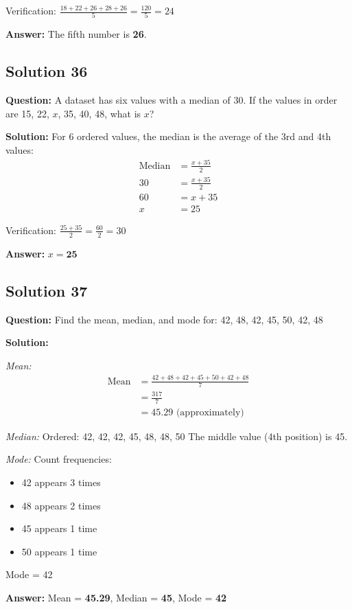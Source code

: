 \documentclass[12pt,a4paper]{article}
\begin{document}
Verification: $\frac{18 + 22 + 26 + 28 + 26}{5} = \frac{120}{5} = 24$ 

\textbf{Answer:} The fifth number is \textbf{26}.

\subsection*{Solution 36}
\textbf{Question:} A dataset has six values with a median of 30. If the values in order are 15, 22, $x$, 35, 40, 48, what is $x$?

\textbf{Solution:} For 6 ordered values, the median is the average of the 3rd and 4th values:
\begin{align*}
\text{Median} &= \frac{x + 35}{2} \\
30 &= \frac{x + 35}{2} \\
60 &= x + 35 \\
x &= 25
\end{align*}

Verification: $\frac{25 + 35}{2} = \frac{60}{2} = 30$ 

\textbf{Answer:} $x = \textbf{25}$

\subsection*{Solution 37}
\textbf{Question:} Find the mean, median, and mode for: 42, 48, 42, 45, 50, 42, 48

\textbf{Solution:}

\textit{Mean:}
\begin{align*}
\text{Mean} &= \frac{42 + 48 + 42 + 45 + 50 + 42 + 48}{7} \\
&= \frac{317}{7} \\
&= 45.29 \text{ (approximately)}
\end{align*}

\textit{Median:} Ordered: 42, 42, 42, 45, 48, 48, 50
The middle value (4th position) is 45.

\textit{Mode:} Count frequencies:
\begin{itemize}
    \item 42 appears 3 times
    \item 48 appears 2 times
    \item 45 appears 1 time
    \item 50 appears 1 time
\end{itemize}

Mode = 42

\textbf{Answer:} Mean = \textbf{45.29}, Median = \textbf{45}, Mode = \textbf{42}
\end{document}
